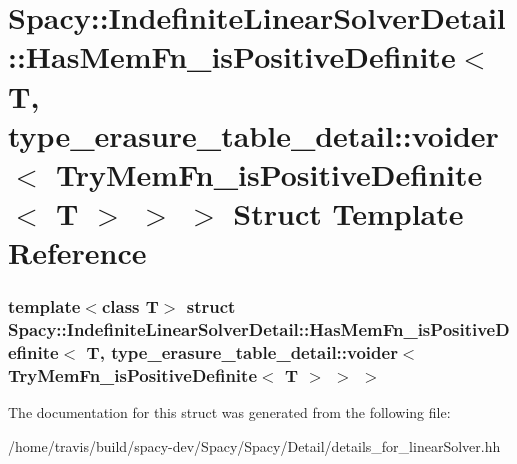 \hypertarget{structSpacy_1_1IndefiniteLinearSolverDetail_1_1HasMemFn__isPositiveDefinite_3_01T_00_01type__era89bd4979ae48c14120f8d39ed5ada5be}{\section{\-Spacy\-:\-:\-Indefinite\-Linear\-Solver\-Detail\-:\-:\-Has\-Mem\-Fn\-\_\-is\-Positive\-Definite$<$ \-T, type\-\_\-erasure\-\_\-table\-\_\-detail\-:\-:voider$<$ \-Try\-Mem\-Fn\-\_\-is\-Positive\-Definite$<$ \-T $>$ $>$ $>$ \-Struct \-Template \-Reference}
\label{structSpacy_1_1IndefiniteLinearSolverDetail_1_1HasMemFn__isPositiveDefinite_3_01T_00_01type__era89bd4979ae48c14120f8d39ed5ada5be}
}
\subsubsection*{template$<$class T$>$ struct Spacy\-::\-Indefinite\-Linear\-Solver\-Detail\-::\-Has\-Mem\-Fn\-\_\-is\-Positive\-Definite$<$ T, type\-\_\-erasure\-\_\-table\-\_\-detail\-::voider$<$ Try\-Mem\-Fn\-\_\-is\-Positive\-Definite$<$ T $>$ $>$ $>$}



\-The documentation for this struct was generated from the following file\-:\begin{DoxyCompactItemize}
\item 
/home/travis/build/spacy-\/dev/\-Spacy/\-Spacy/\-Detail/details\-\_\-for\-\_\-linear\-Solver.\-hh\end{DoxyCompactItemize}
